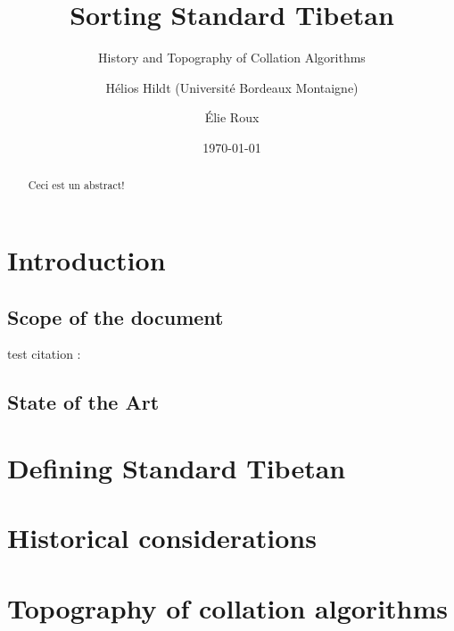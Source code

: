 \documentclass[%
a4paper,%
pagesize,%
12pt,%
parskip=off,%
bibliography=totoc,%
numbers=noenddot,%
DIV=12,%
twoside=semi,%
headings=normal%
]{scrartcl}
\title{Sorting Standard Tibetan}
\subtitle{History and Topography of Collation Algorithms}
\author{Hélios Hildt (Université Bordeaux Montaigne) \and Élie Roux}
\date{\today}
\begin{document}
\maketitle

\begin{abstract}
Ceci est un abstract!
\end{abstract}


\tableofcontents

\newpage

\section{Introduction}

\subsection{Scope of the document}

test citation : \cite{YisunTsikchen}

\subsection{State of the Art}

\section{Defining Standard Tibetan}

\section{Historical considerations}

\section{Topography of collation algorithms}



\end{document}
